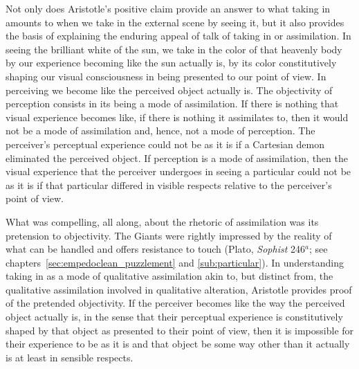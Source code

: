 Not only does Aristotle's positive claim provide an answer to what taking in amounts to when we take in the external scene by seeing it, but it also provides the basis of explaining the enduring appeal of talk of taking in or assimilation. In seeing the brilliant white of the sun, we take in the color of that heavenly body by our experience becoming like the sun actually is, by its color constitutively shaping our visual consciousness in being presented to our point of view. In perceiving we become like the perceived object actually is. The objectivity of perception consists in its being a mode of assimilation. If there is nothing that visual experience becomes like, if there is nothing it assimilates to, then it would not be a mode of assimilation and, hence, not a mode of perception. The perceiver's perceptual experience could not be as it is if a Cartesian demon eliminated the perceived object. If perception is a mode of assimilation, then the visual experience that the perceiver undergoes in seeing a particular could not be as it is if that particular differed in visible respects relative to the perceiver's point of view.

What was compelling, all along, about the rhetoric of assimilation was its pretension to objectivity. The Giants were rightly impressed by the reality of what can be handled and offers resistance to touch (Plato, \emph{Sophist} 246\( ^{a} \); see chapters~\ref{sec:empedoclean_puzzlement} and \ref{sub:particular}). In understanding taking in as a mode of qualitative assimilation akin to, but distinct from, the qualitative assimilation involved in qualitative alteration, Aristotle provides proof of the pretended objectivity. If the perceiver becomes like the way the perceived object actually is, in the sense that their perceptual experience is constitutively shaped by that object as presented to their point of view, then it is impossible for their experience to be as it is and that object be some way other than it actually is at least in sensible respects.

